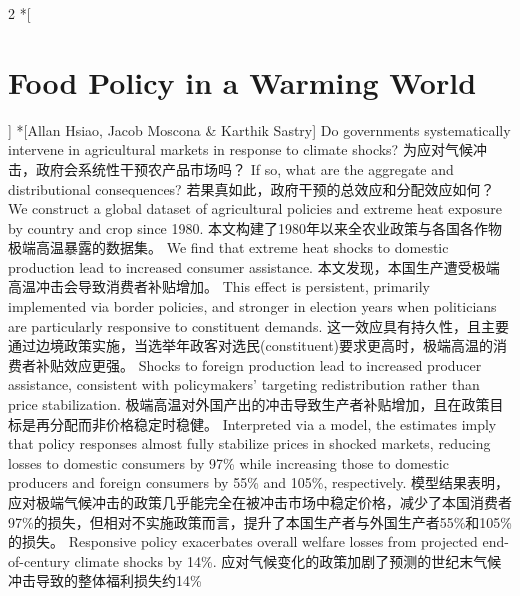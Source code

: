 \documentclass[cn,hazy,blue,14pt,screen]{elegantnote}
\begin{document}
\begin{paracol}{2}
	\switchcolumn[0]*[\section{Food Policy in a Warming World}]
	\switchcolumn[0]*[Allan Hsiao, Jacob Moscona \& Karthik Sastry]
	\switchcolumn
	\switchcolumn
	Do governments systematically intervene in agricultural markets in response to climate shocks? \switchcolumn
	为应对气候冲击，政府会系统性干预农产品市场吗？
	\switchcolumn*
	If so, what are the aggregate and distributional consequences? 
	\switchcolumn
	若果真如此，政府干预的总效应和分配效应如何？
	\switchcolumn*
	We construct a global dataset of agricultural policies and extreme heat exposure by country and crop since 1980. 
	\switchcolumn
	本文构建了1980年以来全农业政策与各国各作物极端高温暴露的数据集。
	\switchcolumn*
	We find that extreme heat shocks to domestic production lead to increased consumer assistance. 
	\switchcolumn
	本文发现，本国生产遭受极端高温冲击会导致消费者补贴增加。
	\switchcolumn*
	This effect is persistent, primarily implemented via border policies, and stronger in election years when politicians are particularly responsive to constituent demands. 
	\switchcolumn
	这一效应具有持久性，且主要通过边境政策实施，当选举年政客对选民(constituent)要求更高时，极端高温的消费者补贴效应更强。
	\switchcolumn*
	Shocks to foreign production lead to increased producer assistance, consistent with policymakers' targeting redistribution rather than price stabilization. 
	\switchcolumn
	极端高温对外国产出的冲击导致生产者补贴增加，且在政策目标是再分配而非价格稳定时稳健。
	\switchcolumn*
	Interpreted via a model, the estimates imply that policy responses almost fully stabilize prices in shocked markets, reducing losses to domestic consumers by 97\% while increasing those to domestic producers and foreign consumers by 55\% and 105\%, respectively. 
	\switchcolumn
	模型结果表明，应对极端气候冲击的政策几乎能完全在被冲击市场中稳定价格，减少了本国消费者97\%的损失，但相对不实施政策而言，提升了本国生产者与外国生产者55\%和105\%的损失。
	\switchcolumn*
	Responsive policy exacerbates overall welfare losses from projected end-of-century climate shocks by 14\%.
	\switchcolumn
	应对气候变化的政策加剧了预测的世纪末气候冲击导致的整体福利损失约14\%
		\switchcolumn
\end{paracol}
\end{document}
